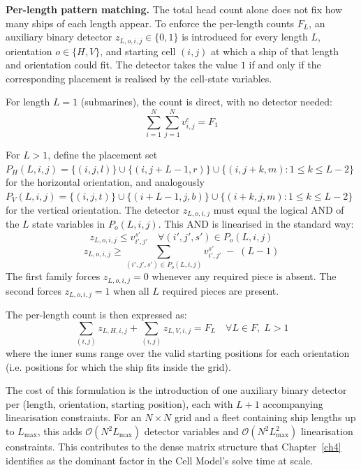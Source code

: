 \textbf{Per-length pattern matching.}
The total head count alone does not fix how many ships of each length appear. To enforce the per-length counts $F_L$, an auxiliary binary detector $z_{L,o,i,j} \in \{0, 1\}$ is introduced for every length $L$, orientation $o \in \{H, V\}$, and starting cell $(i,j)$ at which a ship of that length and orientation could fit. The detector takes the value $1$ if and only if the corresponding placement is realised by the cell-state variables.

For length $L = 1$ (submarines), the count is direct, with no detector needed:
\begin{equation}
    \sum_{i=1}^{N} \sum_{j=1}^{N} v_{i,j}^c = F_1
\end{equation}

For $L > 1$, define the placement set $P_H(L, i, j) = \{(i, j, l)\} \cup \{(i, j + L - 1, r)\} \cup \{(i, j + k, m) : 1 \leq k \leq L - 2\}$ for the horizontal orientation, and analogously $P_V(L, i, j) = \{(i, j, t)\} \cup \{(i + L - 1, j, b)\} \cup \{(i + k, j, m) : 1 \leq k \leq L - 2\}$ for the vertical orientation. The detector $z_{L,o,i,j}$ must equal the logical AND of the $L$ state variables in $P_o(L, i, j)$. This AND is linearised in the standard way:
\begin{equation}
    z_{L,o,i,j} \leq v_{i', j'}^{s'} \quad \forall (i', j', s') \in P_o(L, i, j)
\end{equation}
\begin{equation}
    z_{L,o,i,j} \geq \sum_{(i', j', s') \in P_o(L, i, j)} v_{i', j'}^{s'} \;-\; (L - 1)
\end{equation}
The first family forces $z_{L,o,i,j} = 0$ whenever any required piece is absent. The second forces $z_{L,o,i,j} = 1$ when all $L$ required pieces are present.

The per-length count is then expressed as:
\begin{equation}\label{eq:cell-per-length-count}
    \sum_{(i,j)} z_{L,H,i,j} + \sum_{(i,j)} z_{L,V,i,j} = F_L \quad \forall L \in F, \; L > 1
\end{equation}
where the inner sums range over the valid starting positions for each orientation (i.e. positions for which the ship fits inside the grid).

The cost of this formulation is the introduction of one auxiliary binary detector per (length, orientation, starting position), each with $L + 1$ accompanying linearisation constraints. For an $N \times N$ grid and a fleet containing ship lengths up to $L_{\max}$, this adds $\mathcal{O}(N^2 L_{\max})$ detector variables and $\mathcal{O}(N^2 L_{\max}^2)$ linearisation constraints. This contributes to the dense matrix structure that Chapter~\ref{ch4} identifies as the dominant factor in the Cell Model's solve time at scale.

